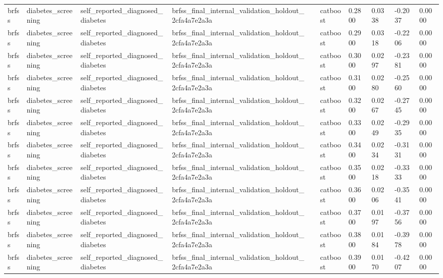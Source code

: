 \begin{tabular}{llllllllll}
brfss & diabetes\_screening & self\_reported\_diagnosed\_diabetes & brfss\_final\_internal\_validation\_holdout\_2cfa4a7e2a3a &  & catboost & 0.2800 & 0.0338 & -0.2037 & 0.0000 \\
brfss & diabetes\_screening & self\_reported\_diagnosed\_diabetes & brfss\_final\_internal\_validation\_holdout\_2cfa4a7e2a3a &  & catboost & 0.2900 & 0.0318 & -0.2206 & 0.0000 \\
brfss & diabetes\_screening & self\_reported\_diagnosed\_diabetes & brfss\_final\_internal\_validation\_holdout\_2cfa4a7e2a3a &  & catboost & 0.3000 & 0.0297 & -0.2381 & 0.0000 \\
brfss & diabetes\_screening & self\_reported\_diagnosed\_diabetes & brfss\_final\_internal\_validation\_holdout\_2cfa4a7e2a3a &  & catboost & 0.3100 & 0.0280 & -0.2560 & 0.0000 \\
brfss & diabetes\_screening & self\_reported\_diagnosed\_diabetes & brfss\_final\_internal\_validation\_holdout\_2cfa4a7e2a3a &  & catboost & 0.3200 & 0.0267 & -0.2745 & 0.0000 \\
brfss & diabetes\_screening & self\_reported\_diagnosed\_diabetes & brfss\_final\_internal\_validation\_holdout\_2cfa4a7e2a3a &  & catboost & 0.3300 & 0.0249 & -0.2935 & 0.0000 \\
brfss & diabetes\_screening & self\_reported\_diagnosed\_diabetes & brfss\_final\_internal\_validation\_holdout\_2cfa4a7e2a3a &  & catboost & 0.3400 & 0.0234 & -0.3131 & 0.0000 \\
brfss & diabetes\_screening & self\_reported\_diagnosed\_diabetes & brfss\_final\_internal\_validation\_holdout\_2cfa4a7e2a3a &  & catboost & 0.3500 & 0.0218 & -0.3333 & 0.0000 \\
brfss & diabetes\_screening & self\_reported\_diagnosed\_diabetes & brfss\_final\_internal\_validation\_holdout\_2cfa4a7e2a3a &  & catboost & 0.3600 & 0.0206 & -0.3541 & 0.0000 \\
brfss & diabetes\_screening & self\_reported\_diagnosed\_diabetes & brfss\_final\_internal\_validation\_holdout\_2cfa4a7e2a3a &  & catboost & 0.3700 & 0.0197 & -0.3756 & 0.0000 \\
brfss & diabetes\_screening & self\_reported\_diagnosed\_diabetes & brfss\_final\_internal\_validation\_holdout\_2cfa4a7e2a3a &  & catboost & 0.3800 & 0.0184 & -0.3978 & 0.0000 \\
brfss & diabetes\_screening & self\_reported\_diagnosed\_diabetes & brfss\_final\_internal\_validation\_holdout\_2cfa4a7e2a3a &  & catboost & 0.3900 & 0.0170 & -0.4207 & 0.0000 \\

\end{tabular}
